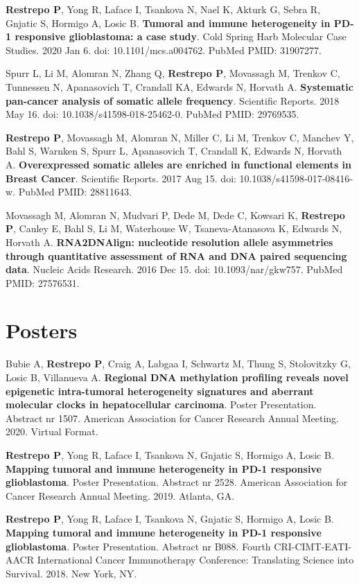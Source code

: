 \begin{minipage}[t]{0.675\textwidth}
\begin{tightitemize}
\item \textbf{Restrepo P}, Yong R, Laface I, Tsankova N, Nael K, Akturk G, Sebra R, Gnjatic S, Hormigo A, Losic B. \textbf{Tumoral and immune heterogeneity in PD-1 responsive glioblastoma: a case study}. Cold Spring Harb Molecular Case Studies. 2020 Jan 6. doi: 10.1101/mcs.a004762. PubMed PMID: 31907277.

\item Spurr L, Li M, Alomran N, Zhang Q, \textbf{Restrepo P}, Movassagh M, Trenkov C, Tunnessen N, Apanasovich T, Crandall KA, Edwards N, Horvath A. \textbf{Systematic pan-cancer analysis of somatic allele frequency}. Scientific Reports. 2018 May 16. doi: 10.1038/s41598-018-25462-0. PubMed PMID: 29769535.

\item \textbf{Restrepo P}, Movassagh M, Alomran N, Miller C, Li M, Trenkov C, Manchev Y, Bahl S, Warnken S, Spurr L, Apanasovich T, Crandall K, Edwards N, Horvath A. \textbf{Overexpressed somatic alleles are enriched in functional elements in Breast Cancer}. Scientific Reports. 2017 Aug 15. doi: 10.1038/s41598-017-08416-w. PubMed PMID: 28811643.

\item Movassagh M, Alomran N, Mudvari P, Dede M, Dede C, Kowsari K, \textbf{Restrepo P}, Cauley E, Bahl S, Li M, Waterhouse W, Tsaneva-Atanasova K, Edwards N, Horvath A. \textbf{RNA2DNAlign: nucleotide resolution allele asymmetries through quantitative assessment of RNA and DNA paired sequencing data}. Nucleic Acids Research. 2016 Dec 15. doi: 10.1093/nar/gkw757. PubMed PMID: 27576531.
\end{tightitemize}

\section{Posters}
\vspace{\topsep} %
\begin{tightitemize}
\item Bubie A, \textbf{Restrepo P}, Craig A, Labgaa I, Schwartz M, Thung S, Stolovitzky G, Losic B, Villanueva A. \textbf{Regional DNA methylation profiling reveals novel epigenetic intra-tumoral heterogeneity signatures and aberrant molecular clocks in hepatocellular carcinoma}. Poster Presentation. Abstract nr 1507. American Association for Cancer Research Annual Meeting. 2020. Virtual Format.
\item \textbf{Restrepo P}, Yong R, Laface I, Tsankova N, Gnjatic S, Hormigo A, Losic B. \textbf{Mapping tumoral and immune heterogeneity in PD-1 responsive glioblastoma}. Poster Presentation. Abstract nr 2528. American Association for Cancer Research Annual Meeting. 2019. Atlanta, GA.
\item \textbf{Restrepo P}, Yong R, Laface I, Tsankova N, Gnjatic S, Hormigo A, Losic B. \textbf{Mapping tumoral and immune heterogeneity in PD-1 responsive glioblastoma}. Poster Presentation. Abstract nr B088. Fourth CRI-CIMT-EATI-AACR International Cancer Immunotherapy Conference: Translating Science into Survival. 2018. New York, NY.
\end{tightitemize}


\end{minipage}
